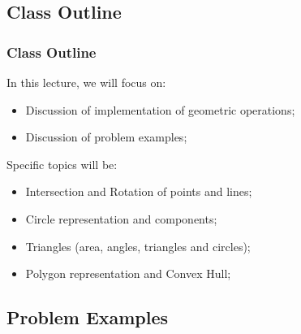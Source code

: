 \subsection{Class Outline}
\begin{frame}
  \frametitle{Class Outline}
  In this lecture, we will focus on:
  \begin{itemize}
    \item Discussion of implementation of geometric operations;
    \item Discussion of problem examples;
  \end{itemize}\bigskip

  Specific topics will be:
  \begin{itemize}
    \item Intersection and Rotation of points and lines;\medskip
    \item Circle representation and components;\medskip
    \item Triangles (area, angles, triangles and circles);\medskip
    \item Polygon representation and Convex Hull;
  \end{itemize}\medskip
\end{frame}

\subsection{Problem Examples}

